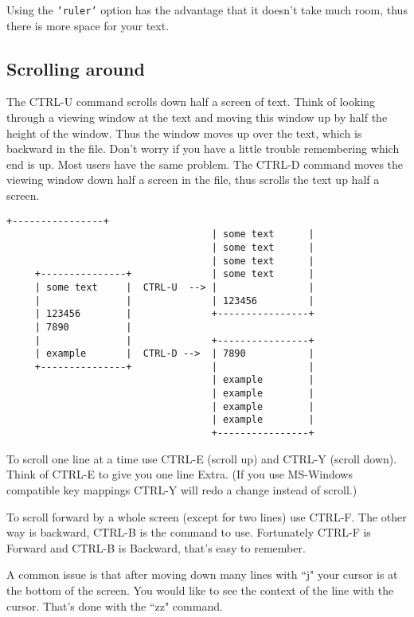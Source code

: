 Using the \texttt{'ruler'} option has the advantage that it doesn't take much room,
thus there is more space for your text.

\subsection{Scrolling around}

The CTRL-U command scrolls down half a screen of text.
Think of looking through a viewing window at the text and moving this window up by half the height of the window.
Thus the window moves up over the text, which is backward in the file.
Don't worry if you have a little trouble remembering which end is up.
Most users have the same problem.
The CTRL-D command moves the viewing window down half a screen in the file, thus scrolls the text up half a screen.

\begin{Verbatim}[samepage=true]
                                    +----------------+
                                    | some text      |
                                    | some text      |
                                    | some text      |
     +---------------+              | some text      |
     | some text     |  CTRL-U  --> |                |
     |               |              | 123456         |
     | 123456        |              +----------------+
     | 7890          |
     |               |              +----------------+
     | example       |  CTRL-D -->  | 7890           |
     +---------------+              |                |
                                    | example        |
                                    | example        |
                                    | example        |
                                    | example        |
                                    +----------------+
\end{Verbatim}

To scroll one line at a time use CTRL-E (scroll up) and CTRL-Y (scroll down).
Think of CTRL-E to give you one line Extra.
(If you use MS-Windows compatible key mappings CTRL-Y will redo a change instead of scroll.)

To scroll forward by a whole screen (except for two lines) use CTRL-F.
The other way is backward, CTRL-B is the command to use.
Fortunately CTRL-F is Forward and CTRL-B is Backward, that's easy to remember.

A common issue is that after moving down many lines with ``j" your cursor is at the bottom of the screen.
You would like to see the context of the line with the cursor.
That's done with the ``zz" command.

